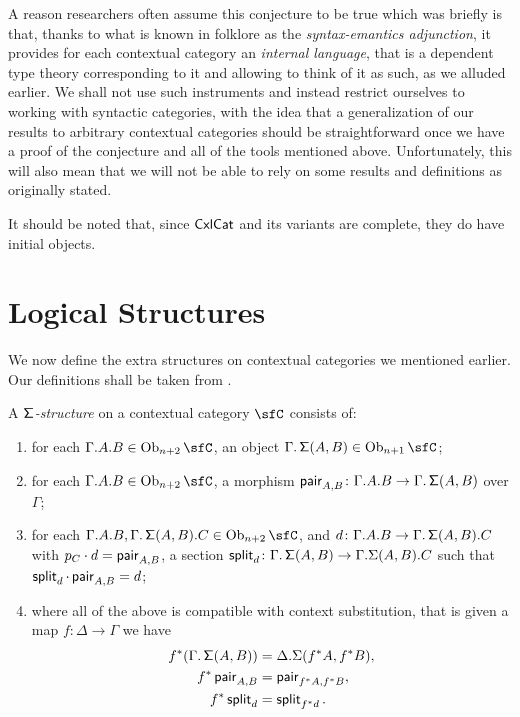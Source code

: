 \begin{rmk}
A reason researchers often assume this conjecture to be true which was briefly
is that, thanks to what is known in folklore as the \emph{syntax-emantics
adjunction}, it provides for each contextual category an \emph{internal
language}, that is a dependent type theory corresponding to it and allowing to
think of it as such, as we alluded earlier. We shall not use such instruments
and instead restrict ourselves to working with syntactic categories, with the
idea that a generalization of our results to arbitrary contextual categories
should be straightforward once we have a proof of the conjecture and all of the
tools mentioned above. Unfortunately,
this will also mean that we will not be able to rely on some results and
definitions as originally stated.
\end{rmk}

\begin{rmk}
It should be noted that, since $\operatorname{\mathsf{CxlCat}}$ and its variants are complete, they do
have initial objects.
\end{rmk}

\section{Logical Structures}

We now define the extra structures on contextual categories we mentioned
earlier. Our definitions shall be taken from \cite{KL12,KL18}.

\begin{defn}
  A \emph{$\operatorname{\mathsf{\Sigma}}$-structure} on a contextual category $\sfC$ consists of:
  \begin{enumerate}
    \item for each $\Gamma.A.B\in\Ob_{n+2}\sfC$, an object
      $\Gamma.\Sigmas(A,B)\in\Ob_{n+1}\sfC$;
    \item for each $\Gamma.A.B\in\Ob_{n+2}\sfC$, a morphism $\operatorname{\mathsf{pair}}_{A,B}\colon
      \Gamma.A.B\rightarrow\Gamma.\operatorname{\mathsf{\Sigma}}(A,B)$ over $\Gamma$;
    \item for each $\Gamma.A.B,\Gamma.\Sigmas(A,B).C\in\Ob_{n+2}\sfC$, and
      $d\colon\Gamma.A.B\rightarrow\Gamma.\operatorname{\mathsf{\Sigma}}(A,B).C$ with $p_C\cdot
      d=\operatorname{\mathsf{pair}}_{A,B}$, a section
      $\operatorname{\mathsf{split}}_d\colon\Gamma.\operatorname{\mathsf{\Sigma}}(A,B)\rightarrow\Gamma.\Sigma(A,B).C$ such
      that $\operatorname{\mathsf{split}}_d\cdot\operatorname{\mathsf{pair}}_{A,B}=d$;
    \item where all of the above is compatible with context substitution, that
      is given a map $f\colon\Delta\rightarrow\Gamma$ we have
      \begin{align*}
        f^*(\Gamma.\operatorname{\mathsf{\Sigma}}(A,B)) &=\Delta.\Sigma(f^*A,f^*B), \\
        f^*\operatorname{\mathsf{pair}}_{A,B} &=\operatorname{\mathsf{pair}}_{f^*A,f^*B}, \\
        f^*\operatorname{\mathsf{split}}_d &=\operatorname{\mathsf{split}}_{f^*d}.
      \end{align*}
  \end{enumerate}
\end{defn}

